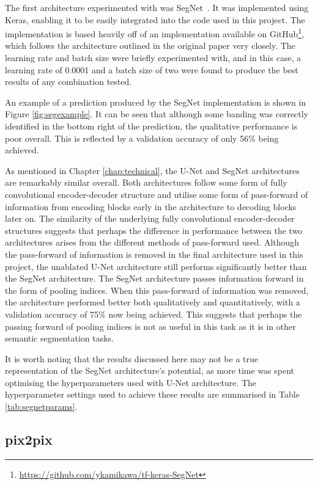 The first architecture experimented with was SegNet~\cite{segnet}. It was implemented using Keras, enabling it to be easily integrated into the code used in this project. The implementation is based heavily off of an implementation available on GitHub\footnote{\url{https://github.com/ykamikawa/tf-keras-SegNet}}, which follows the architecture outlined in the original paper very closely. The learning rate and batch size were briefly experimented with, and in this case, a learning rate of 0.0001 and a batch size of two were found to produce the best results of any combination tested.

An example of a prediction produced by the SegNet implementation is shown in Figure \ref{fig:segexample}. It can be seen that although some banding was correctly identified in the bottom right of the prediction, the qualitative performance is poor overall. This is reflected by a validation accuracy of only 56\% being achieved.

As mentioned in Chapter \ref{chap:technical}, the U-Net and SegNet architectures are remarkably similar overall. Both architectures follow some form of fully convolutional encoder-decoder structure and utilise some form of pass-forward of information from encoding blocks early in the architecture to decoding blocks later on. The similarity of the underlying fully convolutional encoder-decoder structures suggests that perhaps the difference in performance between the two architectures arises from the different methods of pass-forward used. Although the pass-forward of information is removed in the final architecture used in this project, the unablated U-Net architecture still performs significantly better than the SegNet architecture. The SegNet architecture passes information forward in the form of pooling indices. When this pass-forward of information was removed, the architecture performed better both qualitatively and quantitatively, with a validation accuracy of 75\% now being achieved. This suggests that perhaps the passing forward of pooling indices is not as useful in this task as it is in other semantic segmentation tasks.

It is worth noting that the results discussed here may not be a true representation of the SegNet architecture's potential, as more time was spent optimising the hyperparameters used with U-Net architecture. The hyperparameter settings used to achieve these results are summarised in Table \ref{tab:segnetparams}.

\subsection{pix2pix}

